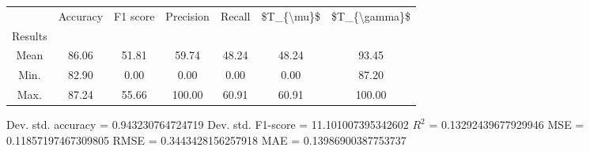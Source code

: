 \begin{tabular}{|c|c|c|c|c|c|c|}
\toprule
{} &  Accuracy &  F1 score &  Precision &  Recall &  \$T\_\{\textbackslash mu\}\$ &  \$T\_\{\textbackslash gamma\}\$ \\
Results &           &           &            &         &            &               \\
\hline
Mean    &     86.06 &     51.81 &      59.74 &   48.24 &      48.24 &         93.45 \\
Min.    &     82.90 &      0.00 &       0.00 &    0.00 &       0.00 &         87.20 \\
Max.    &     87.24 &     55.66 &     100.00 &   60.91 &      60.91 &        100.00 \\
\bottomrule
\end{tabular}

 Dev. std. accuracy = 0.943230764724719
 Dev. std. F1-score = 11.101007395342602
 $R^2$ = 0.13292439677929946
 MSE = 0.11857197467309805
 RMSE = 0.3443428156257918
 MAE = 0.13986900387753737